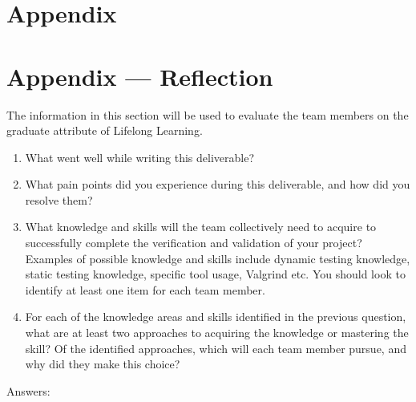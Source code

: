 \documentclass[12pt, titlepage]{article}
\begin{document}
\section{Appendix}

\section*{Appendix --- Reflection}


The information in this section will be used to evaluate the team members on the
graduate attribute of Lifelong Learning.



\begin{enumerate}
  \item What went well while writing this deliverable? 
  \item What pain points did you experience during this deliverable, and how
    did you resolve them?
  \item What knowledge and skills will the team collectively need to acquire to
  successfully complete the verification and validation of your project?
  Examples of possible knowledge and skills include dynamic testing knowledge,
  static testing knowledge, specific tool usage, Valgrind etc.  You should look to
  identify at least one item for each team member.
  \item For each of the knowledge areas and skills identified in the previous
  question, what are at least two approaches to acquiring the knowledge or
  mastering the skill?  Of the identified approaches, which will each team
  member pursue, and why did they make this choice?
\end{enumerate}
Answers:
\end{document}
